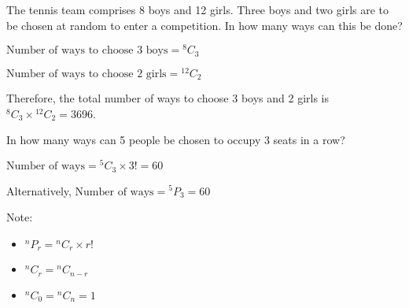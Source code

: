 \documentclass[11pt,a4paper]{book}
\begin{document}
\begin{example}

The tennis team comprises 8 boys and 12 girls. Three boys and two
girls are to be chosen at random to enter a competition. In how many
ways can this be done?


\Solution


$\text{Number of ways to choose 3 boys}={}^{8}C_{3}$

$\text{Number of ways to choose 2 girls}={}^{12}C_{2}$

Therefore, the total number of ways to choose 3 boys and 2 girls is
$^{8}C_{3}\times{}^{12}C_{2}=3696$.


\end{example}

\begin{example}

In how many ways can 5 people be chosen to occupy 3 seats in a row?

\Solution

$\text{Number of ways}={}^{5}C_{3}\times3!=60$

Alternatively, $\text{Number of ways}={}^{5}P_{3}=60$
\end{example}


Note:
\begin{itemize}
\item $^{n}P_{r}={}^{n}C_{r}\times r!$
\item $^{n}C_{r}={}^{n}C_{n-r}$
\item $^{n}C_{0}={}^{n}C_{n}=1$
\end{itemize}

\newpage
\end{document}
